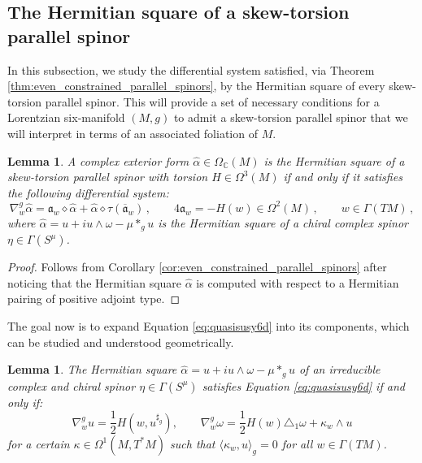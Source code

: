 \documentclass[10pt,a4paper,twoside,reqno]{amsart}
\theoremstyle{plain}
\newtheorem{lemma}[thm]{Lemma}
\theoremstyle{definition}
\theoremstyle{remark}
\def\C{\mathbb{C}}
\def\fra{\mathfrak{a}}
\newcommand{\escal}[1]{\langle#1\rangle}
\begin{document}

\subsection{The Hermitian square of a skew-torsion parallel spinor}


In this subsection, we study the differential system satisfied, via Theorem \ref{thm:even_constrained_parallel_spinors}, by the Hermitian square of every skew-torsion parallel spinor. This will provide a set of necessary conditions for a Lorentzian six-manifold $(M,g)$ to admit a skew-torsion parallel spinor that we will interpret in terms of an associated foliation of $M$.  

\begin{lemma}
A complex exterior form $\widehat{\alpha}\in \Omega_{\C}(M)$ is the Hermitian square of a skew-torsion parallel spinor with torsion $H\in \Omega^3(M)$ if and only if it satisfies the following differential system:
\begin{equation}
\label{eq:quasisusy6d}
\nabla^g_w\widehat{\alpha}=\fra_w\diamond\widehat{\alpha}+\widehat{\alpha}\diamond\tau(\overline{\fra}_w)\, , \qquad 4\fra_w = -H(w)\in\Omega^2(M)\, , \qquad w\in\Gamma(TM)\, ,
\end{equation}
where $\widehat{\alpha} = u + i u \wedge \omega - \mu \ast_g u$ is the Hermitian square of a chiral complex spinor $\eta\in \Gamma(S^{\mu})$.
\end{lemma}

\begin{proof}
Follows from Corollary \ref{cor:even_constrained_parallel_spinors} after noticing that the Hermitian square $\widehat{\alpha}$ is computed with respect to a Hermitian pairing of positive adjoint type.  
\end{proof}

\noindent
The goal now is to expand Equation \eqref{eq:quasisusy6d} into its components, which can be studied and understood geometrically.

\begin{lemma}
\label{lemma:skew_torsion_Hermitian}
The Hermitian square $\widehat{\alpha} = u + i u\wedge \omega - \mu \ast_g u$ of an irreducible complex and chiral spinor $\eta\in \Gamma(S^{\mu})$ satisfies Equation \eqref{eq:quasisusy6d} if and only if:
\begin{equation*}
\nabla^g_wu=\frac{1}{2}H(w,u^{\sharp_g}),\qquad\nabla^g_w\omega=\frac{1}{2}H(w)\triangle_1\omega+\kappa_w\wedge u    
\end{equation*} 
for a certain $\kappa\in\Omega^1(M,T^*M)$ such that $\escal{\kappa_w,u}_g=0$ for all $w\in\Gamma(TM)$.
\end{lemma}
\end{document}
